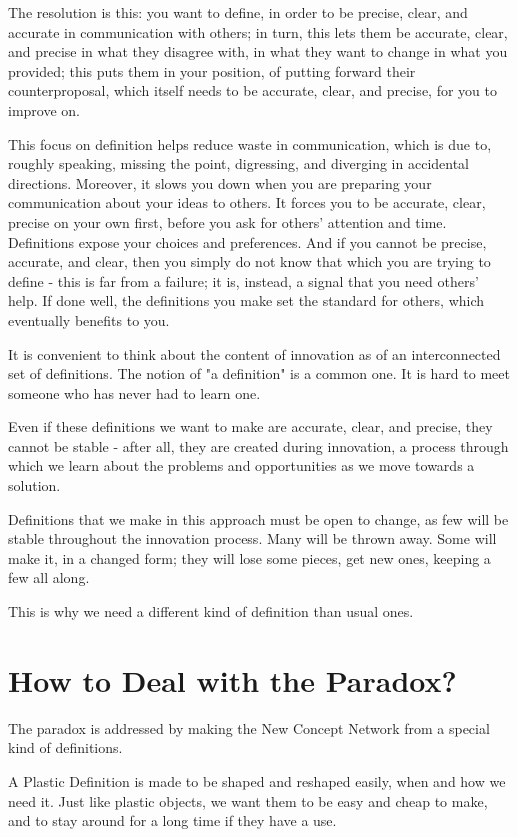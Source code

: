 \documentclass[graybox,envcountchap,sectrefs]{svmono}
\newcommand{\ncnf}{New Concept Network}
\newcommand{\newdef}[1]{Plastic Definition}
\begin{document}
The resolution is this: you want to define, in order to be precise, clear, and accurate in communication with others; in turn, this lets them be accurate, clear, and precise in what they disagree with, in what they want to change in what you provided; this puts them in your position, of putting forward their counterproposal, which itself needs to be accurate, clear, and precise, for you to improve on. 

This focus on definition helps reduce waste in communication, which is due to, roughly speaking, missing the point, digressing, and diverging in accidental directions. Moreover, it slows you down when you are preparing your communication about your ideas to others. It forces you to be accurate, clear, precise on your own first, before you ask for others' attention and time. Definitions expose your choices and preferences. And if you cannot be precise, accurate, and clear, then you simply do not know that which you are trying to define - this is far from a failure; it is, instead, a signal that you need others' help. If done well, the definitions you make set the standard for others, which eventually benefits to you.

It is convenient to think about the content of innovation as of an interconnected set of definitions. The notion of "a definition" is a common one. It is hard to meet someone who has never had to learn one. 

Even if these definitions we want to make are accurate, clear, and precise, they cannot be stable - after all, they are created during innovation, a process through which we learn about the problems and opportunities as we move towards a solution. 

Definitions that we make in this approach must be open to change, as few will be stable throughout the innovation process. Many will be thrown away. Some will make it, in a changed form; they will lose some pieces, get new ones, keeping a few all along. 

This is why we need a different kind of definition than usual ones.


\section{How to Deal with the Paradox?}
\label{c3:s3}
The paradox is addressed by making the \ncnf{} from a special kind of definitions. 

A \newdef{} is made to be shaped and reshaped easily, when and how we need it. Just like plastic objects, we want them to be easy and cheap to make, and to stay around for a long time if they have a use.
\end{document}
